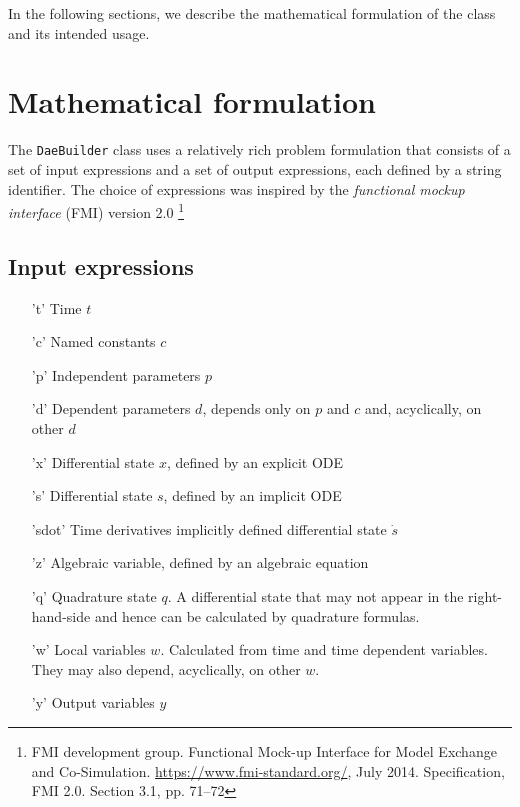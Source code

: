 \documentclass[a4paper,12pt]{book}
\begin{document}
In the following sections, we describe the mathematical formulation of the class
and its intended usage.

\section{Mathematical formulation} \label{sec:daebuilder_io}
The \texttt{DaeBuilder} class uses a relatively rich problem formulation that
consists of a set of input expressions and a set of output expressions, each
defined by a string identifier. The choice of expressions was inspired by the
\emph{functional mockup interface} (FMI) version 2.0
\footnote{FMI development group. Functional Mock-up Interface for Model Exchange and Co-Simulation. \url{https://www.fmi-standard.org/}, July 2014. Specification, FMI 2.0. Section 3.1, pp. 71–72}

\subsection*{Input expressions}
\begin{enumerate}
  \item['t'] Time $t$
  \item['c'] Named constants $c$
  \item['p'] Independent parameters $p$
  \item['d'] Dependent parameters $d$, depends only on $p$ and $c$ and,
  acyclically, on other $d$
  \item['x'] Differential state $x$, defined by an explicit ODE
  \item['s'] Differential state $s$, defined by an implicit ODE
  \item['sdot'] Time derivatives implicitly defined differential state $\dot{s}$
  \item['z'] Algebraic variable, defined by an algebraic equation
  \item['q'] Quadrature state $q$. A differential state that may not appear in
  the right-hand-side and hence can be calculated by quadrature formulas.
  \item['w'] Local variables $w$. Calculated from time and time dependent
  variables. They may also depend, acyclically, on other $w$.
  \item['y'] Output variables $y$
\end{enumerate}
\end{document}
